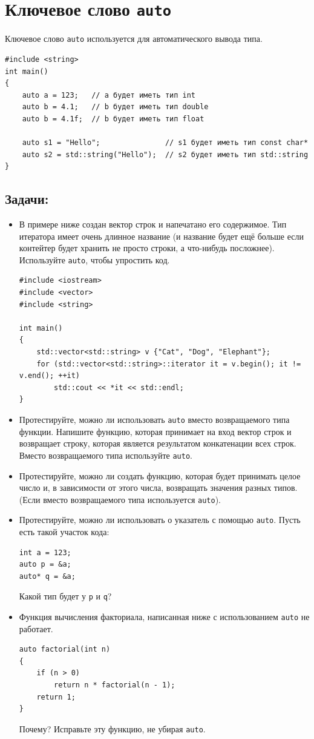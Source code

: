\documentclass{article}
\begin{document}
\newpage

\section*{Ключевое слово \texttt{auto}}
Ключевое слово \texttt{auto} используется для автоматического вывода типа.
\begin{lstlisting}
#include <string>
int main() 
{
    auto a = 123;   // a будет иметь тип int
    auto b = 4.1;   // b будет иметь тип double
    auto b = 4.1f;  // b будет иметь тип float
    
    auto s1 = "Hello";               // s1 будет иметь тип const char*
    auto s2 = std::string("Hello");  // s2 будет иметь тип std::string
}

\end{lstlisting}


\subsection*{Задачи:}
\begin{itemize}
\item В примере ниже создан вектор строк и напечатано его содержимое. Тип итератора имеет очень длинное название (и название будет ещё больше если контейтер будет хранить не просто строки, а что-нибудь посложнее). Используйте \texttt{auto}, чтобы упростить код.
\begin{lstlisting}
#include <iostream>
#include <vector>
#include <string>

int main() 
{
    std::vector<std::string> v {"Cat", "Dog", "Elephant"};
    for (std::vector<std::string>::iterator it = v.begin(); it != v.end(); ++it)
    	std::cout << *it << std::endl;    
}
\end{lstlisting}

\item Протестируйте, можно ли использовать \texttt{auto} вместо возвращаемого типа функции. Напишите функцию, которая принимает на вход вектор строк и возвращает строку, которая является результатом конкатенации всех строк. Вместо возвращаемого типа используйте \texttt{auto}.
\item Протестируйте, можно ли создать функцию, которая будет принимать целое число и, в зависимости от этого числа, возвращать значения разных типов. (Если вместо возвращаемого типа используется \texttt{auto}).

\item Протестируйте, можно ли использовать о указатель с помощью \texttt{auto}. Пусть есть такой участок кода:
\begin{lstlisting}
int a = 123;
auto p = &a;
auto* q = &a;
\end{lstlisting}
Какой тип будет у \texttt{p} и \texttt{q}?
\item Функция вычисления факториала, написанная ниже с использованием \texttt{auto} не работает. 
\begin{lstlisting}
auto factorial(int n) 
{
    if (n > 0)
        return n * factorial(n - 1);
    return 1;
}
\end{lstlisting}
Почему? Исправьте эту функцию, не убирая \texttt{auto}.
\end{itemize}
\end{document}
